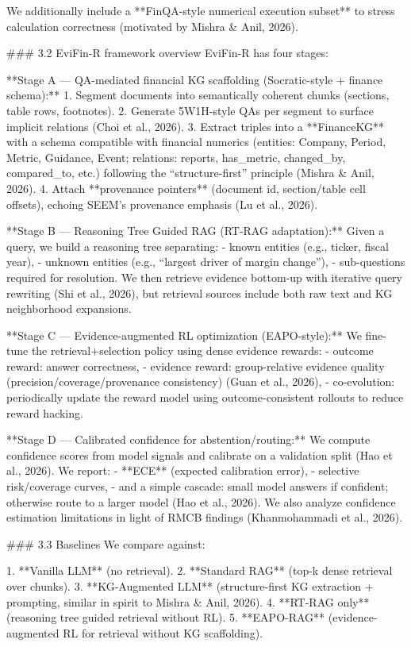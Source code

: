 We additionally include a **FinQA-style numerical execution subset** to stress calculation correctness (motivated by Mishra & Anil, 2026).

### 3.2 EviFin-R framework overview  
EviFin-R has four stages:

**Stage A — QA-mediated financial KG scaffolding (Socratic-style + finance schema):**  
1. Segment documents into semantically coherent chunks (sections, table rows, footnotes).  
2. Generate 5W1H-style QAs per segment to surface implicit relations (Choi et al., 2026).  
3. Extract triples into a **FinanceKG** with a schema compatible with financial numerics (entities: Company, Period, Metric, Guidance, Event; relations: reports, has_metric, changed_by, compared_to, etc.) following the “structure-first” principle (Mishra & Anil, 2026).  
4. Attach **provenance pointers** (document id, section/table cell offsets), echoing SEEM’s provenance emphasis (Lu et al., 2026).

**Stage B — Reasoning Tree Guided RAG (RT-RAG adaptation):**  
Given a query, we build a reasoning tree separating:
- known entities (e.g., ticker, fiscal year),
- unknown entities (e.g., “largest driver of margin change”),
- sub-questions required for resolution.  
We then retrieve evidence bottom-up with iterative query rewriting (Shi et al., 2026), but retrieval sources include both raw text and KG neighborhood expansions.

**Stage C — Evidence-augmented RL optimization (EAPO-style):**  
We fine-tune the retrieval+selection policy using dense evidence rewards:
- outcome reward: answer correctness,
- evidence reward: group-relative evidence quality (precision/coverage/provenance consistency) (Guan et al., 2026),
- co-evolution: periodically update the reward model using outcome-consistent rollouts to reduce reward hacking.

**Stage D — Calibrated confidence for abstention/routing:**  
We compute confidence scores from model signals and calibrate on a validation split (Hao et al., 2026). We report:
- **ECE** (expected calibration error),
- selective risk/coverage curves,
- and a simple cascade: small model answers if confident; otherwise route to a larger model (Hao et al., 2026).  
We also analyze confidence estimation limitations in light of RMCB findings (Khanmohammadi et al., 2026).

### 3.3 Baselines  
We compare against:

1. **Vanilla LLM** (no retrieval).  
2. **Standard RAG** (top-k dense retrieval over chunks).  
3. **KG-Augmented LLM** (structure-first KG extraction + prompting, similar in spirit to Mishra & Anil, 2026).  
4. **RT-RAG only** (reasoning tree guided retrieval without RL).  
5. **EAPO-RAG** (evidence-augmented RL for retrieval without KG scaffolding).  

